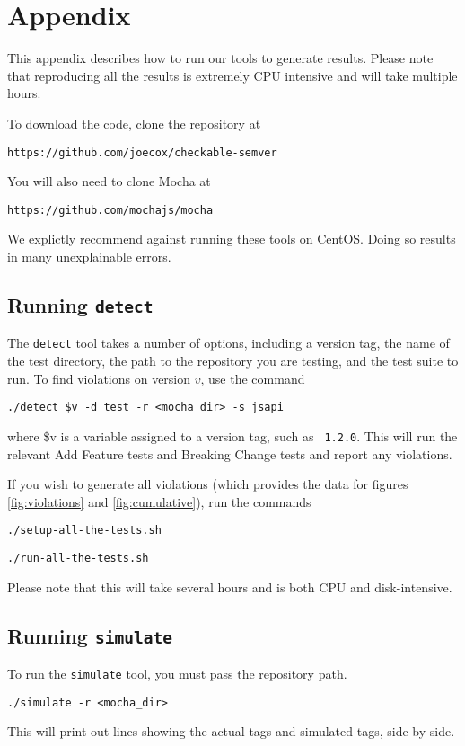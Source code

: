 \section{Appendix}
This appendix describes how to run our tools to generate
results. Please note that reproducing all the results is extremely
CPU intensive and will take multiple hours.

To download the code, clone the repository at
\begin{center}
  {\tt https://github.com/joecox/checkable-semver}
\end{center}

You will also need to clone Mocha at
\begin{center}
  {\tt https://github.com/mochajs/mocha}
\end{center}

We explictly recommend against running these tools on CentOS. Doing
so results in many unexplainable errors.

\subsection{Running {\large {\tt detect}}}

The {\tt detect} tool takes a number of options, including a version
tag, the name of the test directory, the path to the repository you
are testing, and the test suite to run. To find violations on version
$v$, use the command

\begin{center}
  {\tt ./detect \$v -d test -r <mocha\_dir> -s jsapi}
\end{center}
where \$v is a variable assigned to a version tag, such as {\tt
  1.2.0}. This will run the relevant Add Feature tests and Breaking
Change tests and report any violations.

If you wish to generate all violations (which provides the data for
figures \ref{fig:violations} and \ref{fig:cumulative}), run the
commands

\begin{center}
  {\tt ./setup-all-the-tests.sh}
\end{center}
\begin{center}
  {\tt ./run-all-the-tests.sh}
\end{center}
Please note that this will take several hours and is both CPU and
disk-intensive.

\subsection{Running {\large {\tt simulate}}}

To run the {\tt simulate} tool, you must pass the repository path.

\begin{center}
  {\tt ./simulate -r <mocha\_dir>}
\end{center}
This will print out lines showing the actual tags and simulated tags,
side by side.
